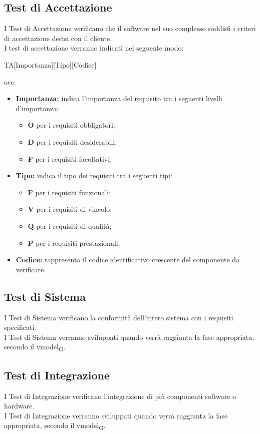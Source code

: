 \subsection{Test di Accettazione}
I Test di Accettazione verificano che il software nel suo complesso soddisfi i criteri di accettazione decisi con il cliente.\\I test di accettazione verranno indicati nel seguente modo:\\
\begin{center}
	TA[Importanza][Tipo][Codice]\\
\end{center}
ove:
\begin{itemize}
	\item \textbf{Importanza:} indica l'importanza del requisito tra i seguenti livelli d'importanza:
		\begin{itemize}
			\item \textbf{O} per i requisiti obbligatori;
			\item \textbf{D} per i requisiti desiderabili;
			\item \textbf{F} per i requisiti facoltativi.
		\end{itemize}
	\item \textbf{Tipo:} indica il tipo dei requisiti tra i seguenti tipi:
		\begin{itemize}
			\item \textbf{F} per i requisiti funzionali;
			\item \textbf{V} per i requisiti di vincolo;
			\item \textbf{Q} per i requisiti di qualità;
			\item \textbf{P} per i requisiti prestazionali.
		\end{itemize}
	\item \textbf{Codice:} rappresenta il codice identificativo crescente del componente da verificare.
\end{itemize}
\subsection{Test di Sistema}
I Test di Sistema verificano la conformità dell'intero sistema con i requisiti specificati.\\I Test di Sistema verranno sviluppati quando verrà raggiunta la fase appropriata, secondo il \gls{vmodel}\textsubscript{G}.

\subsection{Test di Integrazione}
I Test di Integrazione verificano l'integrazione di più componenti software o hardware.\\I Test di Integrazione verranno sviluppati quando verrà raggiunta la fase appropriata, secondo il \gls{vmodel}\textsubscript{G}.

